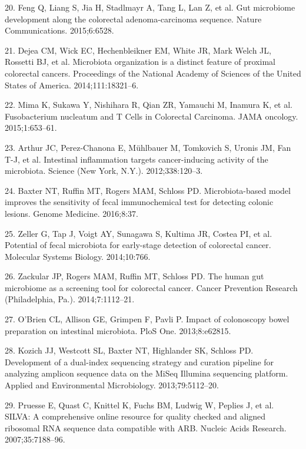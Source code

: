 \documentclass[12pt,]{article}
\begin{document}
\hypertarget{ref-feng_gut_2015}{}
20. Feng Q, Liang S, Jia H, Stadlmayr A, Tang L, Lan Z, et al. Gut
microbiome development along the colorectal adenoma-carcinoma sequence.
Nature Communications. 2015;6:6528.

\hypertarget{ref-dejea_microbiota_2014}{}
21. Dejea CM, Wick EC, Hechenbleikner EM, White JR, Mark Welch JL,
Rossetti BJ, et al. Microbiota organization is a distinct feature of
proximal colorectal cancers. Proceedings of the National Academy of
Sciences of the United States of America. 2014;111:18321--6.

\hypertarget{ref-mima_fusobacterium_2015}{}
22. Mima K, Sukawa Y, Nishihara R, Qian ZR, Yamauchi M, Inamura K, et
al. Fusobacterium nucleatum and T Cells in Colorectal Carcinoma. JAMA
oncology. 2015;1:653--61.

\hypertarget{ref-arthur_intestinal_2012}{}
23. Arthur JC, Perez-Chanona E, Mühlbauer M, Tomkovich S, Uronis JM, Fan
T-J, et al. Intestinal inflammation targets cancer-inducing activity of
the microbiota. Science (New York, N.Y.). 2012;338:120--3.

\hypertarget{ref-baxter_microbiota-based_2016}{}
24. Baxter NT, Ruffin MT, Rogers MAM, Schloss PD. Microbiota-based model
improves the sensitivity of fecal immunochemical test for detecting
colonic lesions. Genome Medicine. 2016;8:37.

\hypertarget{ref-zeller_potential_2014}{}
25. Zeller G, Tap J, Voigt AY, Sunagawa S, Kultima JR, Costea PI, et al.
Potential of fecal microbiota for early-stage detection of colorectal
cancer. Molecular Systems Biology. 2014;10:766.

\hypertarget{ref-zackular_human_2014}{}
26. Zackular JP, Rogers MAM, Ruffin MT, Schloss PD. The human gut
microbiome as a screening tool for colorectal cancer. Cancer Prevention
Research (Philadelphia, Pa.). 2014;7:1112--21.

\hypertarget{ref-obrien_impact_2013}{}
27. O'Brien CL, Allison GE, Grimpen F, Pavli P. Impact of colonoscopy
bowel preparation on intestinal microbiota. PloS One. 2013;8:e62815.

\hypertarget{ref-kozich_development_2013}{}
28. Kozich JJ, Westcott SL, Baxter NT, Highlander SK, Schloss PD.
Development of a dual-index sequencing strategy and curation pipeline
for analyzing amplicon sequence data on the MiSeq Illumina sequencing
platform. Applied and Environmental Microbiology. 2013;79:5112--20.

\hypertarget{ref-pruesse_silva_2007}{}
29. Pruesse E, Quast C, Knittel K, Fuchs BM, Ludwig W, Peplies J, et al.
SILVA: A comprehensive online resource for quality checked and aligned
ribosomal RNA sequence data compatible with ARB. Nucleic Acids Research.
2007;35:7188--96.
\end{document}
